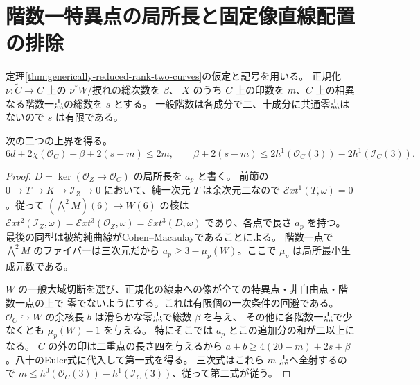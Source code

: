 \section{階数一特異点の局所長と固定像直線配置の排除}
\label{sec:cofactor-singular-curve}
定理\ref{thm:generically-reduced-rank-two-curves}の仮定と記号を用いる。
正規化 $\nu:\widetilde C\to C$ 上の $\nu^*W$/捩れの総次数を $\beta$、
$X$ のうち $C$ 上の印数を $m$、$C$ 上の相異なる階数一点の総数を $s$ とする。
一般階数は各成分で二、十成分に共通零点はないので $s$ は有限である。
\begin{proposition}\label{prop:cofactor-singular-length}
次の二つの上界を得る。
\[
 6d+2\chi(\mathcal O_C)+\beta+2(s-m)\le 2m,\qquad
 \beta+2(s-m)\le 2h^1(\mathcal O_C(3))-2h^1(\mathcal I_C(3)).
\]
\end{proposition}
\begin{proof}
$D=\ker(\mathcal O_Z\to\mathcal O_C)$ の局所長を $a_p$ と書く。
前節の $0\to T\to K\to\mathcal I_Z\to0$ において、純一次元 $T$ は余次元二なので
$\mathcal Ext^1(T,\omega)=0$。従って $(\bigwedge^2 M)(6)\to W(6)$ の核は
$\mathcal Ext^2(\mathcal I_Z,\omega)=\mathcal Ext^3(\mathcal O_Z,\omega)
=\mathcal Ext^3(D,\omega)$ であり、各点で長さ $a_p$ を持つ。
最後の同型は被約純曲線がCohen--Macaulayであることによる。
階数一点で $\bigwedge^2 M$ のファイバーは三次元だから
$a_p\ge3-\mu_p(W)$。ここで $\mu_p$ は局所最小生成元数である。

$W$ の一般大域切断を選び、正規化の線束への像が全ての特異点・非自由点・階数一点の上で
零でないようにする。これは有限個の一次条件の回避である。
$\mathcal O_C\hookrightarrow W$ の余核長 $b$ は滑らかな零点で総数 $\beta$ を与え、
その他に各階数一点で少なくとも $\mu_p(W)-1$ を与える。
特にそこでは $a_p$ とこの追加分の和が二以上になる。
$C$ の外の印は二重点の長さ四を与えるから
$a+b\ge 4(20-m)+2s+\beta$。八十のEuler式に代入して第一式を得る。
三次式はこれら $m$ 点へ全射するので
$m\le h^0(\mathcal O_C(3))-h^1(\mathcal I_C(3))$、従って第二式が従う。
\end{proof}

